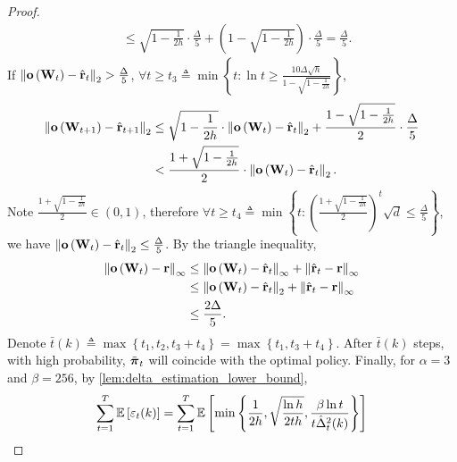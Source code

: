 \begin{proof}
\begin{equation*}
\begin{split}
    &\le \sqrt{1 - \frac{1}{2 h}} \cdot \frac{\Delta}{5} + \left(1 - \sqrt{1 - \frac{1}{2 h}}\right) \cdot \frac{\Delta}{5} = \frac{\Delta}{5}.
\end{split}
\end{equation*}
If $\left\| {\mathbf{o}}\left( {\mathbf{W}}_t \right) - \hat{{\mathbf{r}}}_t\right\|_2 > \frac{\Delta}{5}$, $\forall t \ge t_3 \triangleq \min\left\{ t: \ln{t} \ge \frac{10 \Delta \sqrt{h}}{1 - \sqrt{1 - \frac{1}{2 h}}} \right\}$,
\begin{equation*}
\begin{split}
    \left\| {\mathbf{o}}\left( {\mathbf{W}}_{t+1} \right) - \hat{{\mathbf{r}}}_{t+1}\right\|_2 &\le \sqrt{1 - \frac{1}{2 h}} \cdot \left\| {\mathbf{o}}\left( {\mathbf{W}}_t \right) - \hat{{\mathbf{r}}}_t\right\|_2 + \frac{1 - \sqrt{1 - \frac{1}{2 h}}}{2} \cdot \frac{\Delta}{5} \\
    &< \frac{1 + \sqrt{1 - \frac{1}{2 h}}}{2} \cdot \left\| {\mathbf{o}}\left( {\mathbf{W}}_t \right) - \hat{{\mathbf{r}}}_t\right\|_2.
\end{split}
\end{equation*}
Note $\frac{1 + \sqrt{1 - \frac{1}{2 h}}}{2} \in \left(0, 1\right)$, therefore $\forall t \ge t_4 \triangleq \min{\left\{ t : \left( \frac{1 + \sqrt{1 - \frac{1}{2 h}}}{2} \right)^t \sqrt{d} \le \frac{\Delta}{5}  \right\}}$, we have $\left\| {\mathbf{o}}\left( {\mathbf{W}}_t \right) - \hat{{\mathbf{r}}}_t\right\|_2 \le \frac{\Delta}{5}$. By the triangle inequality,
\begin{equation*}
\begin{split}
    \left\| {\mathbf{o}}\left( {\mathbf{W}}_t \right) - {\mathbf{r}} \right\|_\infty &\le \left\| {\mathbf{o}}\left( {\mathbf{W}}_t \right) - \hat{{\mathbf{r}}}_t\right\|_\infty + \left\| \hat{{\mathbf{r}}}_t - {\mathbf{r}}\right\|_\infty \\
    &\le \left\| {\mathbf{o}}\left( {\mathbf{W}}_t \right) - \hat{{\mathbf{r}}}_t\right\|_2 + \left\| \hat{{\mathbf{r}}}_t - {\mathbf{r}}\right\|_\infty \\
    &\le \frac{2 \Delta}{5}. \qedhere
\end{split}
\end{equation*}
Denote $\bar{t}(k) \triangleq \max\left\{ t_1, t_2, t_3 + t_4 \right\} = \max\left\{ t_1, t_3 + t_4 \right\} $. After $\bar{t}(k)$ steps, with high probability, $\tilde{{\boldsymbol{\pi}}}_t$ will coincide with the optimal policy. Finally, for $\alpha = 3$ and $\beta = 256$, by \cref{lem:delta_estimation_lower_bound},
\begin{equation*}
\begin{split}
    \sum\limits_{t=1}^{T}{ \expectation{ \left[ \varepsilon_t(k) \right]} } &= \sum\limits_{t=1}^{T}{ \expectation{ \left[ \min\left\{ \frac{1}{2 h}, \sqrt{\frac{\ln{h}}{2 t h}},  \frac{\beta \ln{t}}{t \hat{\Delta}_t^2(k)} \right\} \right]} } \\

\end{split}
\end{equation*}
\end{proof}
